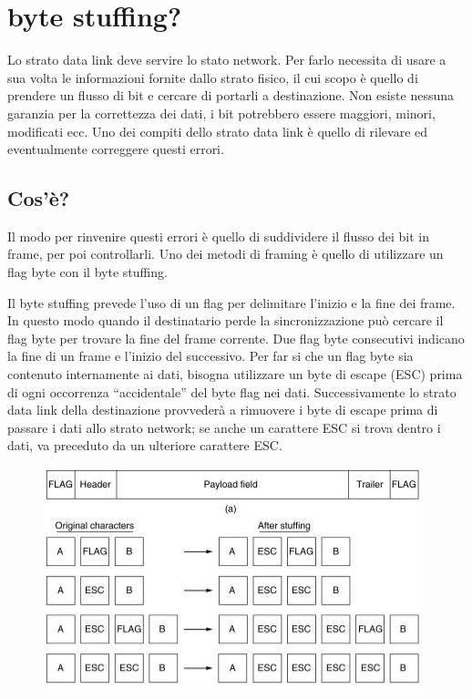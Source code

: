 \section{byte stuffing?}
Lo strato data link deve servire lo stato network. Per farlo necessita di usare a sua volta le informazioni fornite dallo strato fisico, il cui scopo è quello di prendere un flusso di bit e cercare di portarli a destinazione.
Non esiste nessuna garanzia per la correttezza dei dati, i bit potrebbero essere maggiori, minori, modificati ecc. Uno dei compiti dello strato data link è quello di rilevare ed eventualmente correggere questi errori.
\subsection{Cos'è?}
Il modo per rinvenire questi errori è quello di suddividere il flusso dei bit in frame, per poi controllarli. Uno dei metodi di framing è quello di utilizzare un flag byte con il byte stuffing.

Il byte stuffing prevede l'uso di un flag per delimitare l'inizio e la fine dei frame. In questo modo quando il destinatario perde la sincronizzazione può cercare il flag byte per trovare la fine del frame corrente. Due flag byte consecutivi indicano la fine di un frame e l'inizio del successivo.
Per far si che un flag byte sia contenuto internamente ai dati, bisogna utilizzare un byte di escape (ESC) prima di ogni occorrenza “accidentale” del byte flag nei dati. Successivamente lo strato data link della destinazione provvederà a rimuovere i byte di escape prima di passare i dati allo strato network; se anche un carattere ESC si trova dentro i dati, va preceduto da un ulteriore carattere ESC.


\begin{figure}[H]
\centering
\includegraphics[scale=0.8]{res/img/13_ByteStuffing.png}
\end{figure}

